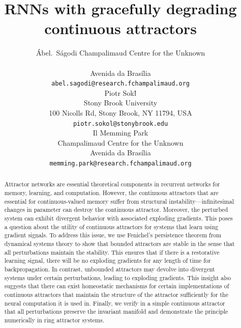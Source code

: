 \documentclass{article}
\title{RNNs with gracefully degrading continuous attractors}
\author{%
  \'Abel.~S\'agodi %
 Champalimaud Centre for the Unknown\\
  \\
  Avenida da Brasília \\
  \texttt{abel.sagodi@research.fchampalimaud.org} \\
   \And
   Piotr Sok\'\l \\
   Stony Brook University \\
   100 Nicolls Rd, Stony Brook, NY 11794, USA \\
   \texttt{piotr.sokol@stonybrook.edu} \\
   \AND
   Il Memming Park \\
   Champalimaud Centre for the Unknown \\
   Avenida da Brasília  \\
   \texttt{memming.park@research.fchampalimaud.org} 
}
\newcounter{ct}
\theoremstyle{definition}
\theoremstyle{remark}
\begin{document}
    


\maketitle

\begin{abstract}
Attractor networks are essential theoretical components in recurrent networks for memory, learning, and computation.
However, the continuous attractors that are essential for continuous-valued memory suffer from structural instability---infinitesimal changes in parameter can destroy the continuous attractor.
Moreover, the perturbed system can exhibit divergent behavior with associated exploding gradients.
This poses a question about the utility of continuous attractors for systems that learn using gradient signals.
To address this issue, we use Fenichel's persistence theorem from dynamical systems theory to show that bounded attractors are stable in the sense that all perturbations maintain the stability.
This ensures that if there is a restorative learning signal, there will be no exploding gradients for any length of time for backpropagation.
In contrast, unbounded attractors may devolve into divergent systems under certain perturbations, leading to exploding gradients.
This insight also suggests that there can exist homeostatic mechanisms for certain implementations of continuous attractors that maintain the structure of the attractor sufficiently for the neural computation it is used in.
Finally, we verify in a simple continuous attractor that all perturbations preserve the invariant manifold and demonstrate the principle numerically in ring attractor systems.
\end{abstract}


%
\end{document}
